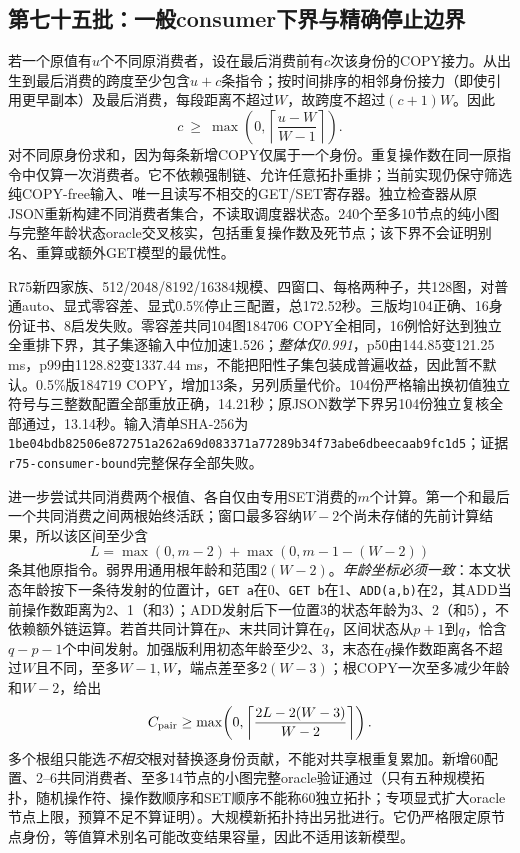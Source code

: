 \documentclass[UTF8,11pt,fontset=fandol]{ctexart}
\begin{document}
\subsection{第七十五批：一般consumer下界与精确停止边界}
若一个原值有$u$个不同原消费者，设在最后消费前有$c$次该身份的COPY接力。从出生到最后消费的跨度至少包含$u+c$条指令；按时间排序的相邻身份接力（即使引用更早副本）及最后消费，每段距离不超过$W$，故跨度不超过$(c+1)W$。因此
\[
c\ \geq\ \max\!\left(0,\left\lceil\frac{u-W}{W-1}\right\rceil\right).
\]
对不同原身份求和，因为每条新增COPY仅属于一个身份。重复操作数在同一原指令中仅算一次消费者。它不依赖强制链、允许任意拓扑重排；当前实现仍保守筛选纯COPY-free输入、唯一且读写不相交的GET/SET寄存器。独立检查器从原JSON重新构建不同消费者集合，不读取调度器状态。240个至多10节点的纯小图与完整年龄状态oracle交叉核实，包括重复操作数及死节点；该下界不会证明别名、重算或额外GET模型的最优性。

R75新四家族、512/2048/8192/16384规模、四窗口、每格两种子，共128图，对普通auto、显式零容差、显式0.5\%停止三配置，总172.52秒。三版均104正确、16身份证书、8启发失败。零容差共同104图184706 COPY全相同，16例恰好达到独立全重排下界，其子集逐输入中位加速1.526；\emph{整体仅0.991}，p50由144.85变121.25 ms，p99由1128.82变1337.44 ms，不能把阳性子集包装成普遍收益，因此暂不默认。0.5\%版184719 COPY，增加13条，另列质量代价。104份严格输出换初值独立符号与三整数配置全部重放正确，14.21秒；原JSON数学下界另104份独立复核全部通过，13.14秒。输入清单SHA-256为\texttt{1be04bdb82506e872751a262a69d0833}\allowbreak\texttt{71a77289b34f73abe6dbeecaab9fc1d5}；证据\texttt{r75-consumer-bound}完整保存全部失败。

进一步尝试共同消费两个根值、各自仅由专用SET消费的$m$个计算。第一个和最后一个共同消费之间两根始终活跃；窗口最多容纳$W-2$个尚未存储的先前计算结果，所以该区间至少含
\[
L=\max(0,m-2)+\max(0,m-1-(W-2))
\]
条其他原指令。弱界用通用根年龄和范围$2(W-2)$。\emph{年龄坐标必须一致}：本文状态年龄按下一条待发射的位置计，\texttt{GET a}在0、\texttt{GET b}在1、\texttt{ADD(a,b)}在2，其ADD当前操作数距离为2、1（和3）；ADD发射后下一位置3的状态年龄为3、2（和5），不依赖额外链运算。若首共同计算在$p$、末共同计算在$q$，区间状态从$p+1$到$q$，恰含$q-p-1$个中间发射。加强版利用初态年龄至少2、3，末态在$q$操作数距离各不超过$W$且不同，至多$W-1,W$，端点差至多$2(W-3)$；根COPY一次至多减少年龄和$W-2$，给出
\[
C_{\rm pair}\geq\max\!\left(0,\left\lceil\frac{2L-2(W-3)}{W-2}\right\rceil\right).
\]
多个根组只能选\emph{不相交}根对替换逐身份贡献，不能对共享根重复累加。新增60配置、2--6共同消费者、至多14节点的小图完整oracle验证通过（只有五种规模拓扑，随机操作符、操作数顺序和SET顺序不能称60独立拓扑；专项显式扩大oracle节点上限，预算不足不算证明）。大规模新拓扑持出另批进行。它仍严格限定原节点身份，等值算术别名可能改变结果容量，因此不适用该新模型。
\end{document}
